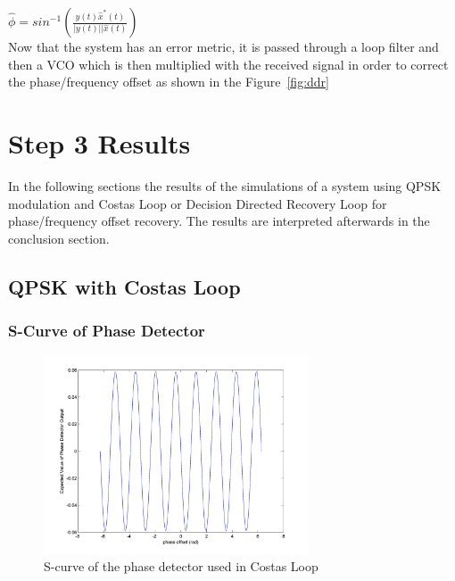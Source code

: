 \documentclass[]{article}
\begin{document}
$\hat{\phi} = sin^{-1}\left(\frac{y(t)\hat{x}^*(t)}{|y(t)||\hat{x}(t)}\right)  $\\

Now that the system has an error metric, it is passed through a loop filter and then a VCO which is then multiplied with the received signal in order to correct the phase/frequency offset as shown in the Figure~\ref{fig:ddr}




\newpage
\section{Step 3 Results}
In the following sections the results of the simulations of a system using QPSK modulation and Costas Loop or Decision Directed Recovery Loop for phase/frequency offset recovery. The results are interpreted afterwards in the conclusion section.

\subsection{QPSK with Costas Loop}

\subsubsection{S-Curve of Phase Detector}
\begin{figure}[H]
\centering
\hspace*{-2cm}\includegraphics[width=0.7\textwidth]{qpScurvepo_costas.jpg}
\caption{S-curve of the phase detector used in Costas Loop \label{fig:costasSphase}}
\end{figure}
\end{document}
